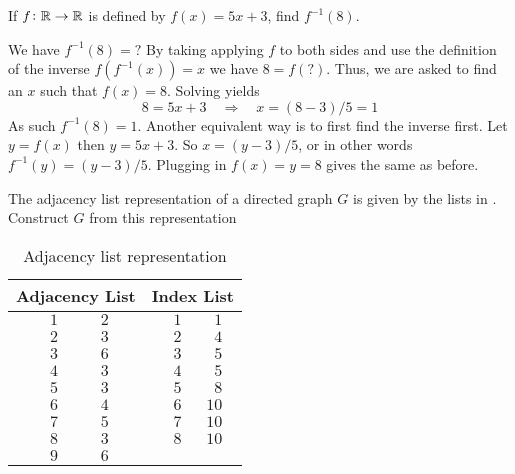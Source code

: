 \documentclass[a4paper, english, 12pt]{article} %
\begin{document}
\newpageanswer

\begin{problem}
  \begin{subproblem}
    If $f \colon \mathbb{R} \to \mathbb{R}$ is defined by $f(x) = 5x + 3$, find $f^{-1}(8)$. 
  \end{subproblem}
\end{problem}

\begin{answer}
  We have $f^{-1}(8) = ?$ By taking applying $f$ to both sides and use the
  definition of the inverse $f(f^{-1}(x)) = x$ we have $8 = f(?)$. Thus, we are
  asked to find an $x$ such that $f(x) = 8$. Solving yields
  \begin{equation*}
    8 = 5x + 3 \quad \Rightarrow \quad x = (8 - 3)/5 = 1
  \end{equation*}
  As such $f^{-1}(8) = 1$. Another equivalent way is to first find the inverse
  first. Let $y = f(x)$ then $y = 5x + 3$. So $x = (y - 3)/5$, or in other words
  $f^{-1}(y) = (y - 3)/5$. Plugging in $f(x) = y = 8$ gives the same as before.
\end{answer}




\begin{problem}[12]
  The adjacency list representation of a directed graph $G$ is given by the
  lists in \cite{table:adjency-list}. Construct $G$ from this representation
  \begin{table}[H]
    \centering
    \caption{Adjacency list representation}
    \label{table:adjency-list}
    \begin{tabular}{p{0.75cm} p{0.75cm} p{1.5cm}|p{0.5cm} p{0.75cm} p{1cm}}
      \toprule
      \multicolumn{3}{c}{Adjacency List} & \multicolumn{3}{c}{Index List} \\
      \midrule
      & $1$ & $2$ && $1$ & $\phantom{1}1$ \\
      & $2$ & $3$ && $2$ & $\phantom{1}4$ \\
      & $3$ & $6$ && $3$ & $\phantom{1}5$ \\
      & $4$ & $3$ && $4$ & $\phantom{1}5$ \\
      & $5$ & $3$ && $5$ & $\phantom{1}8$ \\
      & $6$ & $4$ && $6$ & $10$ \\
      & $7$ & $5$ && $7$ & $10$ \\
      & $8$ & $3$ && $8$ & $10$ \\
      & $9$ & $6$ &&   &    \\
      \bottomrule
    \end{tabular}
  \end{table}
\end{problem}
\end{document}
